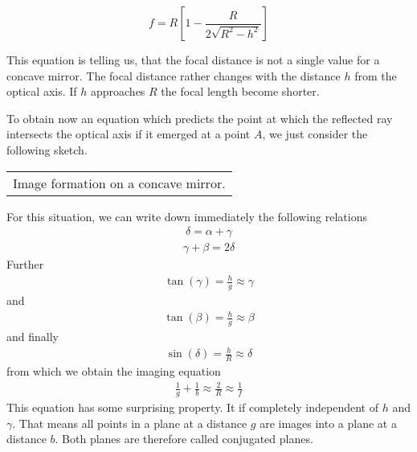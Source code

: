 \documentclass[letterpaper,10pt,english]{sphinxmanual}
\begin{document}
\begin{equation}
f=R\left [ 1-\frac{R}{2\sqrt{R^2-h^2}}\right ]
\end{equation}

This equation is telling us, that the focal distance is not a single value for a concave mirror. The focal distance rather changes with the distance \(h\) from the optical axis. If \(h\) approaches \(R\) the focal length become shorter.

To obtain now an equation which predicts the point at which the reflected ray intersects the optical axis if it emerged at a point \(A\), we just consider the following sketch.


\begin{savenotes}\sphinxattablestart
\centering
\begin{tabulary}{\linewidth}[t]{|T|}
\hline
\sphinxstyletheadfamily 
{}
\\
\hline
{} Image formation on a concave mirror.
\\
\hline
\end{tabulary}
\par
\sphinxattableend\end{savenotes}

For this situation, we can write down immediately the following relations
\begin{equation*}
\begin{split}\delta=\alpha+\gamma\end{split}
\end{equation*}\begin{equation*}
\begin{split}\gamma+\beta=2\delta\end{split}
\end{equation*}
Further
\begin{equation*}
\begin{split}\tan(\gamma)=\frac{h}{g}\approx \gamma\end{split}
\end{equation*}
and
\begin{equation*}
\begin{split}\tan(\beta)=\frac{h}{g}\approx \beta\end{split}
\end{equation*}
and finally
\begin{equation*}
\begin{split}\sin(\delta)=\frac{h}{R}\approx \delta\end{split}
\end{equation*}
from which we obtain the imaging equation
\begin{equation*}
\begin{split}\frac{1}{g}+\frac{1}{b}\approx \frac{2}{R}\approx \frac{1}{f}\end{split}
\end{equation*}
This equation has some surprising property. It if completely independent of \(h\) and \(\gamma\). That means all points in a plane at a distance \(g\) are images into a plane at a distance \(b\). Both planes are therefore called conjugated planes.
\end{document}
